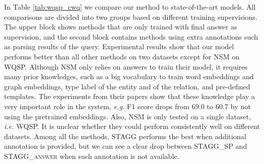  In Table \ref{tab:wqsp_cwq} we compare our method to state-of-the-art models. All comparisons are divided into two groups based on different training supervisions. The upper block shows methods that are only trained with final answer as supervision, and the second block contains methods using extra annotations such as parsing results of the query. Experimental results show that our model performs better than all other methods on two datasets except for NSM \cite{DBLP:conf/acl/LiangBLFL17} on WQSP. Although NSM only relies on answers to train their model, it requires many prior knowledges, such as a big vocabulary to train word embeddings and graph embeddings, type label of the entity and of the relation, and pre-defined templates. The experiments from their papers show that these knowledge play a very important role in the system, \emph{e.g.} F1 score drops from 69.0 to 60.7 by not using the pretrained embeddings. %
 Also, NSM is only tested on a single dataset, \emph{i.e.} WQSP. It is unclear whether they could perform consistently well on different datasets. Among all the methods, \textsc{STAGG} performs the best when additional annotation is provided, but we can see a clear drop between \textsc{STAGG\_SP} and \textsc{STAGG\_answer} when such annotation is not available.




